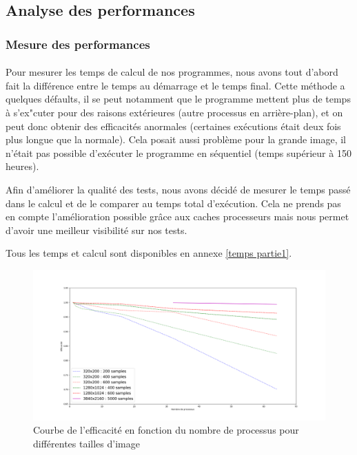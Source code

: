 \documentclass{article}
\begin{document}
\subsection{Analyse des performances}

\subsubsection{Mesure des performances}
\paragraph{}
Pour mesurer les temps de calcul de nos programmes, nous avons tout d'abord fait la diff\'erence entre le temps au d\'emarrage et le temps final. 
Cette m\'ethode a quelques d\'efaults, il se peut notamment que le programme mettent plus de temps à s'ex"cuter pour des raisons ext\'erieures (autre processus en arri\`ere-plan), et on peut donc obtenir des efficacit\'es anormales (certaines exécutions \'etait deux fois plus longue que la normale).
Cela posait aussi probl\`eme pour la grande image, il n'\'etait pas possible d'exécuter le programme en s\'equentiel (temps sup\'erieur \`a 150 heures).

Afin d'am\'eliorer la qualit\'e des tests, nous avons d\'ecid\'e de mesurer le temps pass\'e dans le calcul et de le comparer au temps total d'exécution.
Cela ne prends pas en compte l'am\'elioration possible gr\^ace aux caches processeurs mais nous permet d'avoir une meilleur visibilit\'e sur nos tests.

Tous les temps et calcul sont disponibles en annexe \ref{temps partie1}.

\newpage

\begin{figure}[h!]
  \includegraphics[scale=0.4, center]{temps_partie1.png}
  \caption{Courbe de l'efficacit\'e en fonction du nombre de processus pour diff\'erentes tailles d'image}
\end{figure} 
\end{document}
